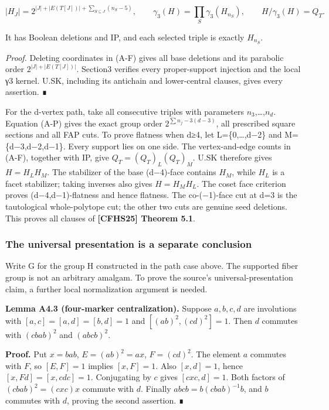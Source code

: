 \documentclass[
  11pt,
  a4paper,
]{article}
\begin{document}
\[
 |H_J|=2^{|J|+|E(T[J])|+\sum_{S\subseteq J}(n_S-5)},\qquad
 \gamma_3(H)=\prod_S\gamma_3(H_{n_S}),\qquad H/\gamma_3(H)=Q_T.
 \tag{A-P}
\]

It has Boolean deletions and IP, and each selected triple is exactly
\(H_{n_S}\).

\emph{Proof.} Deleting coordinates in (A-F) gives all base deletions and
its parabolic order \(2^{|J|+|E(T[J])|}\). Section3 verifies every
proper-support injection and the local γ3 kernel. U.SK, including its
antichain and lower-central clauses, gives every assertion. ∎

For the d-vertex path, take all consecutive triples with parameters
\(n_3\),\ldots,\(n_d\). Equation (A-P) gives the exact group order
\(2^{\sum n_j-3(d-3)}\), all prescribed square sections and all FAP
cuts. To prove flatness when d≥4, let L=\{0,\ldots,d−2\} and
M=\{d−3,d−2,d−1\}. Every support lies on one side. The vertex-and-edge
counts in (A-F), together with IP, give \(Q_T=(Q_T)_L(Q_T)_M\). U.SK
therefore gives \(H=H_LH_M\). The stabilizer of the base (d−4)-face
contains \(H_M\), while \(H_L\) is a facet stabilizer; taking inverses
also gives \(H=H_MH_L\). The coset face criterion proves
(d−4,d−1)-flatness and hence flatness. The co-(−1)-face cut at d=3 is
the tautological whole-polytope cut; the other two cuts are genuine seed
deletions. This proves all clauses of \textbf{{[}CFHS25{]} Theorem 5.1}.

\subsubsection{The universal presentation is a separate
conclusion}\label{the-universal-presentation-is-a-separate-conclusion}

Write G for the group H constructed in the path case above. The
supported fiber group is not an arbitrary amalgam. To prove the source's
universal-presentation claim, a further local normalization argument is
needed.

\textbf{Lemma A4.3 (four-marker centralization).} Suppose \(a,b,c,d\)
are involutions with \([a,c]=[a,d]=[b,d]=1\) and \([ (ab)^2,(cd)^2]=1\).
Then \(d\) commutes with \((cbab)^2\) and \((abcb)^2\).

\textbf{Proof.} Put \(x=bab\), \(E=(ab)^2=ax\), \(F=(cd)^2\). The
element \(a\) commutes with \(F\), so \([E,F]=1\) implies \([x,F]=1\).
Also \([x,d]=1\), hence \([x,Fd]=[x,cdc]=1\). Conjugating by \(c\) gives
\([cxc,d]=1\). Both factors of \((cbab)^2=(cxc)x\) commute with \(d\).
Finally \(abcb=b(cbab)^{-1}b\), and \(b\) commutes with \(d\), proving
the second assertion. ∎
\end{document}
